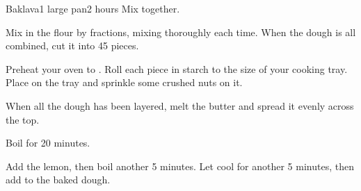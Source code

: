 \documentclass[../Cookbook.tex]{subfiles}
\begin{document}
\begin{recipe}[Baklava]{Baklava}{1 large pan}{2 hours}
Mix together.

Mix in the flour by fractions, mixing thoroughly each time.
When the dough is all combined, cut it into 45 pieces.

Preheat your oven to .
Roll each piece in starch to the size of your cooking tray.
Place on the tray and sprinkle some crushed nuts on it.

When all the dough has been layered, melt the butter and spread it evenly across the top.

Boil for 20 minutes.

Add the lemon, then boil another 5 minutes. Let cool for another 5 minutes, then add to the baked dough.

\end{recipe}
\end{document}
